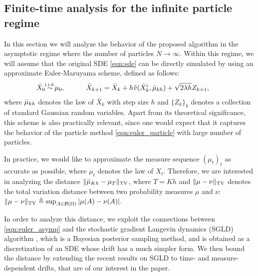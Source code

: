 
\subsection{Finite-time analysis for the infinite particle regime}
%
In this section we will analyze the behavior of the proposed algorithm in the asymptotic regime where the number of particles $N \rightarrow \infty$. Within this regime, we will assume that the original SDE \eqref{eqn:sde} can be directly simulated by using an approximate Euler-Maruyama scheme, defined as follows:
\begin{align}
\bar{X}_0 \simiid \mu_0, \quad \qquad \bar{X}_{k+1} = \bar{X}_k + h \hspace{0.5pt} \hat{v}(\bar{X}^i_k, \bar{\mu}_{kh} ) + \sqrt{2 \lambda h} Z_{k+1}, \qquad \label{eqn:euler_asymp}
\end{align}
where $\bar{\mu}_{kh}$ denotes the law of $\bar{X}_k$ with step size $h$ and $\{Z_k\}_{k}$ denotes a collection of standard Gaussian random variables. Apart from its theoretical significance, this scheme is also practically relevant, since one would expect that it captures the behavior of the particle method \eqref{eqn:euler_particle} with large number of particles. 

In practice, we would like to approximate the measure sequence $(\mu_t)_t$ as accurate as possible, where $\mu_t$ denotes the law of $X_t$. Therefore, we are interested in analyzing the distance $\| \bar{\mu}_{Kh} - \mu_{T} \|_{\textnormal{TV}}$, where $T=Kh$ and $\|\mu-\nu\|_{\textnormal{TV}}$ denotes the total variation distance between two probability measures $\mu$ and $\nu$: $\|\mu-\nu\|_{\textnormal{TV}}\triangleq \sup_{A \in {\cal B}(\Omega)} |\mu(A) -\nu(A) |$. 
%

In order to analyze this distance, we exploit the connections between \eqref{eqn:euler_asymp} and the stochastic gradient Langevin dynamics (SGLD) algorithm \cite{WelTeh2011a}, which is a Bayesian posterior sampling method, and is obtained as a discretization of an SDE whose drift has a much simpler form. We then bound the distance by extending the recent results on SGLD \cite{raginsky17a} to time- and measure-dependent drifts, that are of our interest in the paper.

